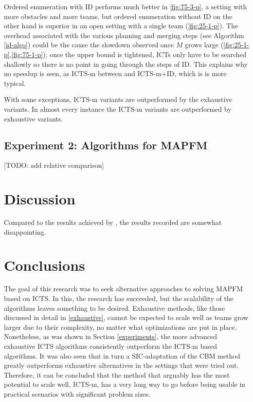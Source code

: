 \documentclass[english,10pt]{article}
\begin{document}
	Ordered enumeration with ID performs much better in \ref{fig:75-3-p}, a setting with more obstacles and more teams, but ordered enumeration without ID on the other hand is superior in an open setting with a single team (\ref{fig:25-1-p}). The overhead associated with the various planning and merging steps (see Algorithm \ref{id-algo}) could be the cause the slowdown observed once $M$ grows large (\ref{fig:25-1-p},\ref{fig:75-1-p}); once the upper bound is tightened, ICTs only have to be searched shallowly so there is no point in going through the steps of ID. This explains why no speedup is seen, as ICTS-m between and ICTS-m+ID, which is is more typical.
	 
	
	With some exceptions, ICTS-m variants are outperformed by the exhaustive variants.
	In almost every instance the ICTS-m variants are outperformed by exhaustive variants. 
	\subsection{Experiment 2: Algorithms for MAPFM}
	[TODO: add relative comparison]

	\section{Discussion}
	
	
	Compared to the results achieved by \cite{ma2016}, the results recorded are somewhat disappointing.
	\section{Conclusions}
	The goal of this research was to seek alternative approaches to solving MAPFM based on ICTS. In this, the research has succeeded, but the scalability of the algorithms leaves something to be desired. Exhaustive methods, like those discussed in detail in \ref{exhaustive}, cannot be expected to scale well as teams grow larger due to their complexity, no matter what optimizations are put in place. Nonetheless, as was shown in Section \ref{experiments}, the more advanced exhaustive ICTS algorithms consistently outperform the ICTS-m based algorithms. It was also seen that in turn a SIC-adaptation of the CBM method \cite{ma2016} greatly outperforms exhaustive alternatives in the settings that were tried out. Therefore, it can be concluded that the method that arguably has the most potential to scale well, ICTS-m, has a very long way to go before being usable in practical scenarios with significant problem sizes.
\end{document}
